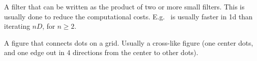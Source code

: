 \begin{definition}
    A filter that can be written as the product of two or more small filters.
    This is usually done to reduce the computational costs.
    E.g.~ is usually faster in 1d than iterating $nD$, for
    $n \ge 2$.
\end{definition}

\begin{definition}[Stencil]
    A figure that connects dots on a grid. Usually a cross-like figure 
    (one center dots, and one edge out in 4 directions from the center to
    other dots).
\end{definition}
